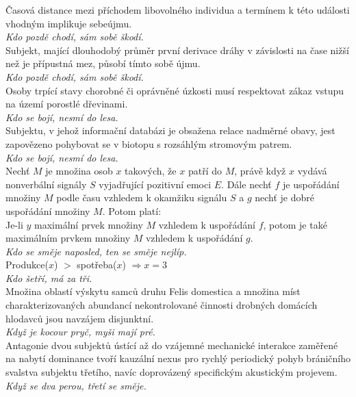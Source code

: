 \begin{multicols}{2}
\noindent
Časová distance mezi příchodem libovolného individua a termínem
k této události vhodným implikuje sebeújmu.\\[1 mm]
{\sl Kdo pozdě chodí, sám sobě škodí.}\\

\noindent
Subjekt, mající dlouhodobý průměr první derivace dráhy v
závislosti na čase nižší než je přípustná mez, působí tímto sobě
újmu.\\[1 mm]
{\sl Kdo pozdě chodí, sám sobě škodí.}\\

\noindent
Osoby trpící stavy chorobné či oprávněné úzkosti musí respektovat
zákaz vstupu na území porostlé dřevinami.\\[1 mm]
{\sl Kdo se bojí, nesmí do lesa.}\\

\noindent
Subjektu, v jehož informační databázi je obsažena relace
nadměrné obavy, jest zapovězeno pohybovat se v biotopu s rozsáhlým
stromovým patrem.\\[1 mm]
{\sl Kdo se bojí, nesmí do lesa.}\\

\noindent
Nechť $M$ je množina osob $x$ takových, že $x$ patří do $M$, právě když
$x$ vydává nonverbální signály $S$ vyjadřující pozitivní emoci $E$. Dále nechť
$f$ je uspořádání množiny $M$ podle času vzhledem k okamžiku signálu $S$ a
$g$ nechť je dobré uspořádání množiny $M$. Potom platí:\\
Je-li $y$ maximální prvek množiny $M$ vzhledem k uspořádání $f$, potom je také
maximálním prvkem množiny $M$ vzhledem k uspořádání $g$.\\[1 mm]
{\sl Kdo se směje naposled, ten se směje nejlíp.}\\

\noindent
Produkce($x$) $>$ spotřeba($x$) $\Rightarrow x = 3$\\[1 mm]
{\sl Kdo šetří, má za tři.}\\

\noindent
Množina oblastí výskytu samců druhu Felis domestica a množina
míst charakterizovaných abundancí nekontrolované činnosti drobných
domácích hlodavců jsou navzájem disjunktní.\\[1 mm]
{\sl Když je kocour pryč, myši mají pré.}\\

\noindent
Antagonie dvou subjektů ústící až do vzájemné mechanické
interakce zaměřené na nabytí dominance tvoří kauzální nexus pro
rychlý periodický pohyb bráničního svalstva subjektu třetího,
navíc doprovázený specifickým akustickým projevem.\\[1 mm]
{\sl Když se dva perou, třetí se směje.}\\


\end{multicols}

